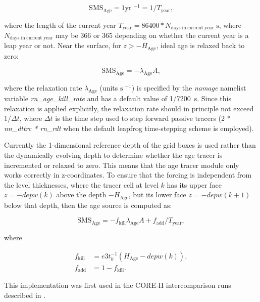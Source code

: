 \documentclass[../main/TOP_manual]{subfiles}
\begin{document}
\begin{equation}
  \label{eq:TOP-age-interior}
  \mathrm{SMS_{\mathrm{Age}}} = 1 \mathrm{yr}\;^{-1} = 1/T_{\mathrm{year}},
\end{equation}

where the length of the current year $T_{\mathrm{year}} = 86400*N_{\mathrm{days\;in\;current\; year}}\;\mathrm{s}$, where $N_{\mathrm{days\;in\;current\; year}}$ may be 366 or 365 depending on whether the current year is a leap year or not.
Near the surface, for $z>-H_{\mathrm{Age}}$, ideal age is relaxed back to zero:

\begin{equation}
  \label{eq:TOP-age-surface}
   \mathrm{SMS_{\mathrm{Age}}} = -\lambda_{\mathrm{Age}}A,
\end{equation}

where the relaxation rate $\lambda_{\mathrm{Age}}$  (units $\mathrm{s}\;^{-1}$) is specified by the \textit{namage} namelist variable \textit{rn\_age\_kill\_rate} and has a default value of 1/7200~s.
Since this relaxation is applied explicitly, the relaxation rate should in principle not exceed $1/\Delta t$, where $\Delta t$ is the time step used to step forward passive tracers (2 * \textit{nn\_dttrc * rn\_rdt} when the default  leapfrog time-stepping scheme is employed).

Currently the 1-dimensional reference depth of the grid boxes is used rather than the dynamically evolving depth to determine whether the age tracer is incremented or relaxed to zero.
This means that the age tracer module only works correctly in z-coordinates.
To ensure that the forcing is independent from the level thicknesses, where the tracer cell at level $k$ has its upper face $z=-depw(k)$ above the depth $-H_{\mathrm{Age}}$, but its lower face $z=-depw(k+1)$ below that depth, then the age source is computed as:

\begin{equation}
  \label{eq:TOP-age-mixed}
   \mathrm{SMS_{\mathrm{Age}}} = -f_{\mathrm{kill}}\lambda_{\mathrm{Age}}A +f_{\mathrm{add}}/T_{\mathrm{year}} ,
\end{equation}

where

\begin{align}
    f_{\mathrm{kill}} &= e3t_k^{-1}(H_{\mathrm{Age}} - depw(k)) , \\
    f_{\mathrm{add}} &= 1 - f_{\mathrm{kill}}.
\end{align}

This implementation was first used in the CORE-II intercomparison runs described in \citet{danabasoglu_2014}.
\end{document}
